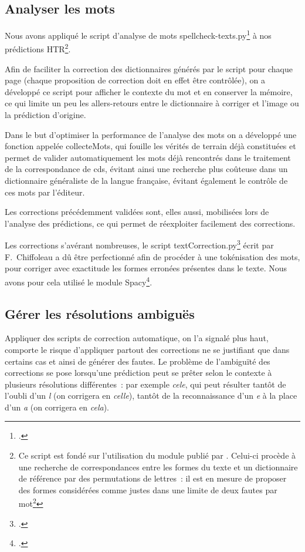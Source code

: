 \documentclass[a4paper,12pt,twoside]{book}
\begin{document}
			\subsection{Analyser les mots}
				Nous avons appliqué le script d'analyse de mots \textsf{spellcheck-texts.py}\footcite{biaySpellcheckTextsPy2022} à nos prédictions HTR\footnote{Ce script est fondé sur l'utilisation du module publié par  \cite{barrusPyspellcheckerPurePython}. Celui-ci procède à une recherche de correspondances entre les formes du texte et un dictionnaire de référence par des permutations de lettres~: il est en mesure de proposer des formes considérées comme justes dans une limite de deux fautes par mot\footnote{Par exemple, il reconnaît que la meilleure proposition pour le mot \textit{deusx} est \textit{deux}, mais n'est pas capable d'associer la forme \textit{pubièes} aux mots de la famille de \textit{publier}}}.
						
				Afin de faciliter la correction des dictionnaires générés par le script pour chaque page (chaque proposition de correction doit en effet être contrôlée), on a développé ce script pour afficher le contexte du mot et en conserver la mémoire, ce qui limite un peu les allers-retours entre le dictionnaire à corriger et l'image ou la prédiction d'origine.
				
				Dans le but d'optimiser la performance de l'analyse des mots on a développé une fonction appelée \textsf{collecteMots}, qui fouille les vérités de terrain déjà constituées et permet de valider automatiquement les mots déjà rencontrés dans le traitement de la correspondance de \gls{cds}, évitant ainsi une recherche plus coûteuse dans un dictionnaire généraliste de la langue française, évitant également le contrôle de ces mots par l'éditeur.
				
				Les corrections précédemment validées sont, elles aussi, mobilisées lors de l'analyse des prédictions, ce qui permet de réexploiter facilement des corrections.
				
				Les corrections s'avérant nombreuses, le script \textsf{textCorrection.py}\footcite{biayTextCorrectionPy2022} écrit par F.~Chiffoleau a dû être perfectionné afin de procéder à une tokénisation des mots, pour corriger avec exactitude les formes erronées présentes dans le texte. Nous avons pour cela utilisé le module Spacy\footcite{SpaCyIndustrialstrengthNatural}.
								
			\subsection{Gérer les résolutions ambiguës}
				Appliquer des scripts de correction automatique, on l'a signalé plus haut, comporte le risque d'appliquer partout des corrections ne se justifiant que dans certains cas et ainsi de générer des fautes. Le problème de l'ambiguïté des corrections se pose lorsqu'une prédiction peut se prêter selon le contexte à plusieurs résolutions différentes~: par exemple \textit{cele}, qui peut résulter tantôt de l'oubli d'un \textit{l} (on corrigera en \textit{celle}), tantôt de la reconnaissance d'un \textit{e} à la place d'un \textit{a} (on corrigera en \textit{cela}).
							
\end{document}
